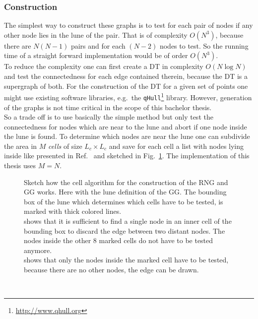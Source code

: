    \subsubsection{Construction}
        The simplest way to construct these graphs is to test for each
        pair of nodes if any other node lies in
        the lune of the pair. That is of complexity \(O (N^3)\), because
        there are \(N(N-1)\) pairs and for each \((N-2)\) nodes to test. So
        the running time of a straight forward implementation would be of
        order \(O(N^3)\).\\
        To reduce the complexity one can first create a DT in complexity \(O (N \log N)\)
        \cite{RNGCell} and test the connectedness for each edge contained
        therein, because the DT is a supergraph of both.
        For the construction of the DT for a given set of points one might
        use existing software libraries, e.g.\ the \texttt{qHull}\footnote{\url{http://www.qhull.org}} library.
        However, generation of the graphs is not time critical in the scope
        of this bachelor thesis.\\
        So a trade off is to use basically the simple method but only test
        the connectedness for nodes which are near to the lune and abort if
        one node inside the lune is found. To determine which nodes are
        near the lune one can subdivide the area in \(M\) \emph{cells} of size
        \(L_c \times L_c\) and save for each cell a list with nodes lying
        inside like presented in Ref.\ \cite{RNGCell} and sketched in Fig.\ \ref{fig:cell}.
        The implementation of this thesis uses \(M=N\).
        \begin{figure}[htbp]
            \centering
            \caption[Sketch how the Cell Method works]
            {
                Sketch how the cell algorithm for the construction of the
                RNG and GG works. Here with the lune definition of the GG.
                The bounding box of the lune which determines which cells have
                to be tested, is marked with thick colored lines.\\
                 shows that it is sufficient to find a
                single node in an inner cell of the bounding box to discard
                the edge between two distant nodes. The nodes inside the
                other 8 marked cells do not have to be tested anymore.\\
                 shows that only the nodes inside the
                marked cell have to be tested, because there are no other nodes,
                the edge can be drawn.
            }
            \label{fig:cell}
        \end{figure}\\
